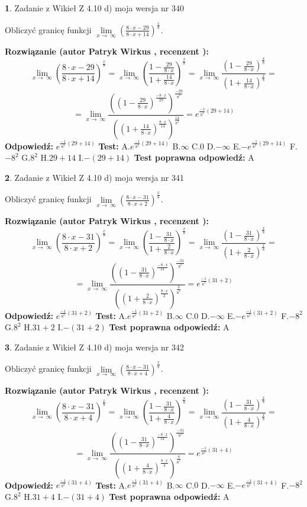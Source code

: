 \documentclass[12pt, a4paper]{article}
\theoremstyle{definition} %
\newtheorem{zad}{}
\newcommand{\zadStart}[1]{\begin{zad}#1\newline}
\newcommand{\zadStop}{\end{zad}}
\newcommand{\rozwStart}[2]{\noindent \textbf{Rozwiązanie (autor #1 , recenzent #2): }\newline}
\newcommand{\rozwStop}{\newline}
\newcommand{\odpStart}{\noindent \textbf{Odpowiedź:}\newline}
\newcommand{\odpStop}{\newline}
\newcommand{\testStart}{\noindent \textbf{Test:}\newline}
\newcommand{\testStop}{\newline}
\newcommand{\kluczStart}{\noindent \textbf{Test poprawna odpowiedź:}\newline}
\newcommand{\kluczStop}{\newline}
\begin{document}
\zadStart{Zadanie z Wikieł Z 4.10 d) moja wersja nr 340}


Obliczyć granicę funkcji  $\lim\limits_{x\to\ \infty}(\frac{8\cdot x-29}{8\cdot x+14})^{\frac{x}{8}}$.
\zadStop
\rozwStart{Patryk Wirkus}{}
$$\lim\limits_{x\to\ \infty}(\frac{8\cdot x-29}{8\cdot x+14})^{\frac{x}{8}} = \lim\limits_{x\to\ \infty}(\frac{1-\frac{29}{8\cdot x}}{1+\frac{14}{8\cdot x}})^{\frac{x}{8}}=\lim\limits_{x\to\ \infty}\frac{(1-\frac{29}{8\cdot x})^{\frac{x}{8}}}{(1+\frac{14}{8\cdot x})^{\frac{x}{8}}}=$$
$$=\lim\limits_{x\to\ \infty}\frac{((1-\frac{29}{8\cdot x})^{\frac{-8\cdot x}{29}})^{\frac{-29}{8^{2}}}}{((1+\frac{14}{8\cdot x})^{\frac{8\cdot x}{14}})^{\frac{14}{8^{2}}}}=e^{\frac{-1}{8^{2}}(29+14)}$$
\rozwStop
\odpStart
$e^{\frac{-1}{8^{2}}(29+14)}$
\odpStop
\testStart
A.$e^{\frac{-1}{8^{2}}(29+14)}$ B.$\infty$ C.$0$ D.$-\infty$ E.$-e^{\frac{-1}{8^{2}}(29+14)}$
F.$-8^{2}$ G.$8^{2}$
H.$29+14$
I.$-(29+14)$
\testStop
\kluczStart
A
\kluczStop



\zadStart{Zadanie z Wikieł Z 4.10 d) moja wersja nr 341}


Obliczyć granicę funkcji  $\lim\limits_{x\to\ \infty}(\frac{8\cdot x-31}{8\cdot x+2})^{\frac{x}{8}}$.
\zadStop
\rozwStart{Patryk Wirkus}{}
$$\lim\limits_{x\to\ \infty}(\frac{8\cdot x-31}{8\cdot x+2})^{\frac{x}{8}} = \lim\limits_{x\to\ \infty}(\frac{1-\frac{31}{8\cdot x}}{1+\frac{2}{8\cdot x}})^{\frac{x}{8}}=\lim\limits_{x\to\ \infty}\frac{(1-\frac{31}{8\cdot x})^{\frac{x}{8}}}{(1+\frac{2}{8\cdot x})^{\frac{x}{8}}}=$$
$$=\lim\limits_{x\to\ \infty}\frac{((1-\frac{31}{8\cdot x})^{\frac{-8\cdot x}{31}})^{\frac{-31}{8^{2}}}}{((1+\frac{2}{8\cdot x})^{\frac{8\cdot x}{2}})^{\frac{2}{8^{2}}}}=e^{\frac{-1}{8^{2}}(31+2)}$$
\rozwStop
\odpStart
$e^{\frac{-1}{8^{2}}(31+2)}$
\odpStop
\testStart
A.$e^{\frac{-1}{8^{2}}(31+2)}$ B.$\infty$ C.$0$ D.$-\infty$ E.$-e^{\frac{-1}{8^{2}}(31+2)}$
F.$-8^{2}$ G.$8^{2}$
H.$31+2$
I.$-(31+2)$
\testStop
\kluczStart
A
\kluczStop



\zadStart{Zadanie z Wikieł Z 4.10 d) moja wersja nr 342}


Obliczyć granicę funkcji  $\lim\limits_{x\to\ \infty}(\frac{8\cdot x-31}{8\cdot x+4})^{\frac{x}{8}}$.
\zadStop
\rozwStart{Patryk Wirkus}{}
$$\lim\limits_{x\to\ \infty}(\frac{8\cdot x-31}{8\cdot x+4})^{\frac{x}{8}} = \lim\limits_{x\to\ \infty}(\frac{1-\frac{31}{8\cdot x}}{1+\frac{4}{8\cdot x}})^{\frac{x}{8}}=\lim\limits_{x\to\ \infty}\frac{(1-\frac{31}{8\cdot x})^{\frac{x}{8}}}{(1+\frac{4}{8\cdot x})^{\frac{x}{8}}}=$$
$$=\lim\limits_{x\to\ \infty}\frac{((1-\frac{31}{8\cdot x})^{\frac{-8\cdot x}{31}})^{\frac{-31}{8^{2}}}}{((1+\frac{4}{8\cdot x})^{\frac{8\cdot x}{4}})^{\frac{4}{8^{2}}}}=e^{\frac{-1}{8^{2}}(31+4)}$$
\rozwStop
\odpStart
$e^{\frac{-1}{8^{2}}(31+4)}$
\odpStop
\testStart
A.$e^{\frac{-1}{8^{2}}(31+4)}$ B.$\infty$ C.$0$ D.$-\infty$ E.$-e^{\frac{-1}{8^{2}}(31+4)}$
F.$-8^{2}$ G.$8^{2}$
H.$31+4$
I.$-(31+4)$
\testStop
\kluczStart
A
\kluczStop
\end{document}
